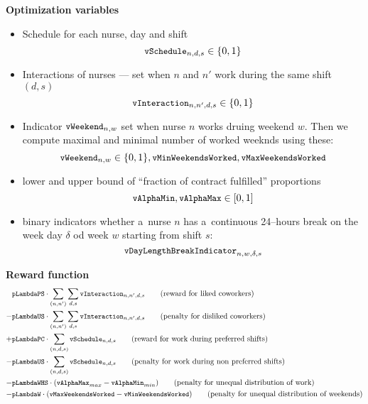 \noindent\textbf{Optimization variables}
\begin{itemize}
    \item Schedule for each nurse, day and shift  
    \[ \texttt{\small vSchedule}_{n,d,s} \in \{0,1\} \]
    \item Interactions of nurses --- set when $n$ and $n'$ work during the same shift $(d, s)$
    \[ \texttt{\small vInteraction}_{n,n',d,s} \in \{0,1\} \]
    \item Indicator $\texttt{\small vWeekend}_{n, w}$ set when nurse $n$ works druing weekend $w$. Then we compute maximal and minimal number of worked weeknds using these:
    \[ \texttt{\small vWeekend}_{n, w} \in \{0, 1\}, \texttt{\small vMinWeekendsWorked}, \texttt{\small vMaxWeekendsWorked} \]
    \item lower and upper bound of ``fraction of contract fulfilled'' proportions
    \[ \texttt{\small vAlphaMin}, \texttt{\small vAlphaMax} \in [0, 1] \]
    \item binary indicators whether a~nurse $n$ has a~continuous 24--hours break on the week day $\delta$ od week $w$ starting from shift $s$:
    \[ \texttt{\small vDayLengthBreakIndicator}_{n, w, \delta, s} \]
\end{itemize}

\noindent\textbf{Reward function}
\begin{align*}
    &\texttt{\small pLambdaPS} \cdot \sum_{(n, n')} \sum_{d,s} \texttt{\small vInteraction}_{n,n',d,s} 
        \qquad\text{(reward for liked coworkers)}\\
    -&\texttt{\small pLambdaUS} \cdot \sum_{(n, n')} \sum_{d,s} \texttt{\small vInteraction}_{n,n',d,s} 
        \qquad\text{(penalty for disliked coworkers)}\\
    +&\texttt{\small pLambdaPC} \cdot \sum_{(n, d, s)} \texttt{\small vSchedule}_{n,d,s} 
        \qquad\text{(reward for work during preferred shifts)}\\
    -&\texttt{\small pLambdaUS} \cdot \sum_{(n, d, s)} \texttt{\small vSchedule}_{n,d,s} 
        \qquad\text{(penalty for work during non preferred shifts)}\\
    -&\texttt{\small pLambdaWHS} \cdot (\texttt{\small vAlphaMax}_{max} - \texttt{\small vAlphaMin}_{min})  
        \qquad\text{(penalty for unequal distribution of work)}\\
    -&\texttt{\small pLambdaW} \cdot (\texttt{\small vMaxWeekendsWorked} - \texttt{\small vMinWeekendsWorked})
        \qquad\text{(penalty for unequal distribution of weekends)}\\
\end{align*}

